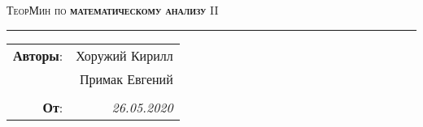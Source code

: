 \documentclass[twoside]{article}
\begin{document}
\setlength{\abovedisplayskip}{5pt}
\setlength{\abovedisplayshortskip}{5pt}
\setlength{\belowdisplayskip}{5pt}
\setlength{\belowdisplayshortskip}{5pt}

\thispagestyle{plain}
\begin{center}
    \LARGE \textsc{ТеорМин по \textbf{математическому анализу} II}
\end{center}

\hrule

\phantom{42}

\begin{flushright}
    \begin{tabular}{rr}
        \textbf{Авторы}: 
        & Хоружий Кирилл \\
        & Примак Евгений \\
        &\\
        \textbf{От}: &
        \textit{26.05.2020}\\
    \end{tabular}
\end{flushright}











\newpage



\newpage


\end{document}
